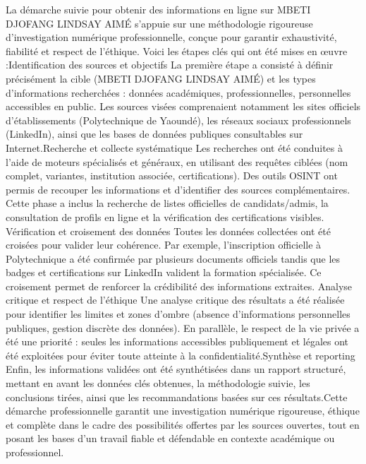\documentclass[12pt, a4paper]{article}
\begin{document}
	La démarche suivie pour obtenir des informations en ligne sur MBETI DJOFANG LINDSAY AIMÉ s’appuie sur une méthodologie rigoureuse d’investigation numérique professionnelle, conçue pour garantir exhaustivité, fiabilité et respect de l’éthique. Voici les étapes clés qui ont été mises en œuvre :Identification des sources et objectifs
	La première étape a consisté à définir précisément la cible (MBETI DJOFANG LINDSAY AIMÉ) et les types d’informations recherchées : données académiques, professionnelles, personnelles accessibles en public. Les sources visées comprenaient notamment les sites officiels d’établissements (Polytechnique de Yaoundé), les réseaux sociaux professionnels (LinkedIn), ainsi que les bases de données publiques consultables sur Internet.Recherche et collecte systématique
	Les recherches ont été conduites à l’aide de moteurs spécialisés et généraux, en utilisant des requêtes ciblées (nom complet, variantes, institution associée, certifications). Des outils OSINT ont permis de recouper les informations et d’identifier des sources complémentaires. Cette phase a inclus la recherche de listes officielles de candidats/admis, la consultation de profils en ligne et la vérification des certifications visibles. Vérification et croisement des données
	Toutes les données collectées ont été croisées pour valider leur cohérence. Par exemple, l’inscription officielle à Polytechnique a été confirmée par plusieurs documents officiels tandis que les badges et certifications sur LinkedIn valident la formation spécialisée. Ce croisement permet de renforcer la crédibilité des informations extraites. Analyse critique et respect de l’éthique
	Une analyse critique des résultats a été réalisée pour identifier les limites et zones d’ombre (absence d’informations personnelles publiques, gestion discrète des données). En parallèle, le respect de la vie privée a été une priorité : seules les informations accessibles publiquement et légales ont été exploitées pour éviter toute atteinte à la confidentialité.Synthèse et reporting
	Enfin, les informations validées ont été synthétisées dans un rapport structuré, mettant en avant les données clés obtenues, la méthodologie suivie, les conclusions tirées, ainsi que les recommandations basées sur ces résultats.Cette démarche professionnelle garantit une investigation numérique rigoureuse, éthique et complète dans le cadre des possibilités offertes par les sources ouvertes, tout en posant les bases d’un travail fiable et défendable en contexte académique ou professionnel.
	
	\newpage
	
\end{document}
